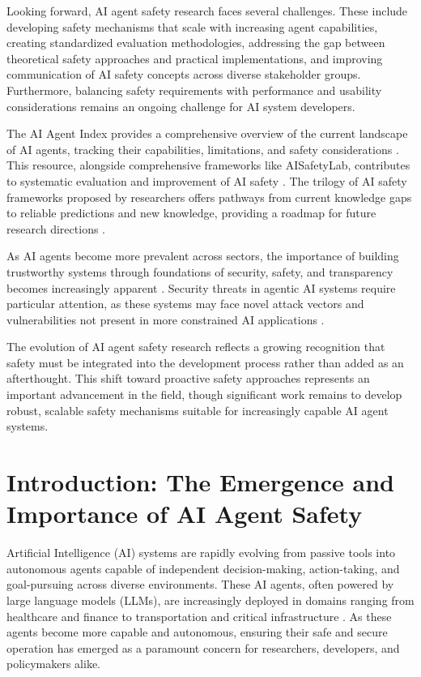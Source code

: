 \documentclass[conference]{IEEEtran}
\begin{document}
Looking forward, AI agent safety research faces several challenges. These include developing safety mechanisms that scale with increasing agent capabilities, creating standardized evaluation methodologies, addressing the gap between theoretical safety approaches and practical implementations, and improving communication of AI safety concepts across diverse stakeholder groups. Furthermore, balancing safety requirements with performance and usability considerations remains an ongoing challenge for AI system developers.

The AI Agent Index provides a comprehensive overview of the current landscape of AI agents, tracking their capabilities, limitations, and safety considerations \cite{2502.01635}. This resource, alongside comprehensive frameworks like AISafetyLab, contributes to systematic evaluation and improvement of AI safety \cite{2502.16776}. The trilogy of AI safety frameworks proposed by researchers offers pathways from current knowledge gaps to reliable predictions and new knowledge, providing a roadmap for future research directions \cite{2410.06946}.

As AI agents become more prevalent across sectors, the importance of building trustworthy systems through foundations of security, safety, and transparency becomes increasingly apparent \cite{2411.12275}. Security threats in agentic AI systems require particular attention, as these systems may face novel attack vectors and vulnerabilities not present in more constrained AI applications \cite{2410.14728}.

The evolution of AI agent safety research reflects a growing recognition that safety must be integrated into the development process rather than added as an afterthought. This shift toward proactive safety approaches represents an important advancement in the field, though significant work remains to develop robust, scalable safety mechanisms suitable for increasingly capable AI agent systems.



\section{Introduction: The Emergence and Importance of AI Agent Safety}

Artificial Intelligence (AI) systems are rapidly evolving from passive tools into autonomous agents capable of independent decision-making, action-taking, and goal-pursuing across diverse environments. These AI agents, often powered by large language models (LLMs), are increasingly deployed in domains ranging from healthcare and finance to transportation and critical infrastructure \cite{2406.08689, 2406.02630}. As these agents become more capable and autonomous, ensuring their safe and secure operation has emerged as a paramount concern for researchers, developers, and policymakers alike.
\end{document}
